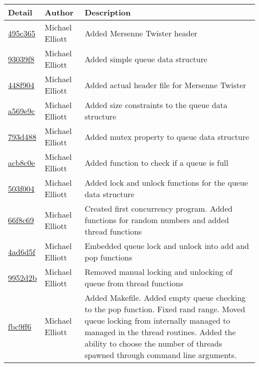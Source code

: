 \documentclass[letterpaper,10pt,titlepage,draftclsnofoot,onecolumn]{IEEEtran}
\begin{document}
\begin{tabular}{l l l}\textbf{Detail} & \textbf{Author} & \textbf{Description}\\\hline
\href{https://github.com/elliomic/CS-444/commit/495c3654bd7736ea43c6a88eb59743eab5e64695}{495c365} & Michael Elliott & Added Mersenne Twister header\\\hline
\href{https://github.com/elliomic/CS-444/commit/93039f88419ac754dcbd9f5e86c4acc2ae075c92}{93039f8} & Michael Elliott & Added simple queue data structure\\\hline
\href{https://github.com/elliomic/CS-444/commit/448f904d4299eed4f7290557a7dd2ed03a731583}{448f904} & Michael Elliott & Added actual header file for Mersenne Twister\\\hline
\href{https://github.com/elliomic/CS-444/commit/a569e9c76e5f3b7d77a61959641102f75df9826e}{a569e9c} & Michael Elliott & Added size constraints to the queue data structure\\\hline
\href{https://github.com/elliomic/CS-444/commit/793d488cb52123a48e8d345293ce4359e2c301c1}{793d488} & Michael Elliott & Added mutex property to queue data structure\\\hline
\href{https://github.com/elliomic/CS-444/commit/acb8c0e69e610e33efc6d0764caa3ccc66a663d9}{acb8c0e} & Michael Elliott & Added function to check if a queue is full\\\hline
\href{https://github.com/elliomic/CS-444/commit/503f004502547d608cf63b7cd5b60aad8b3ab3f7}{503f004} & Michael Elliott & Added lock and unlock functions for the queue data structure\\\hline
\href{https://github.com/elliomic/CS-444/commit/66f8c69f4b2b4122718aad4f72a9eeadd9e06545}{66f8c69} & Michael Elliott & Created first concurrency program. Added functions for random numbers and added thread functions\\\hline
\href{https://github.com/elliomic/CS-444/commit/4ad6d5f2f7a954616d7a38cb8cecd9c26fc3c5f3}{4ad6d5f} & Michael Elliott & Embedded queue lock and unlock into add and pop functions\\\hline
\href{https://github.com/elliomic/CS-444/commit/9952d2b8061cbde3abc5e0b6fb4430c04aaa28e7}{9952d2b} & Michael Elliott & Removed manual locking and unlocking of queue from thread functions\\\hline
\href{https://github.com/elliomic/CS-444/commit/fbc9ff6fcc38d42815a70a9a0efff13171a768ac}{fbc9ff6} & Michael Elliott & Added Makefile. Added empty queue checking to the pop function. Fixed rand range. Moved queue locking from internally managed to managed in the thread routines. Added the ability to choose the number of threads spawned through command line arguments.\\\hline

\end{tabular}
\end{document}
